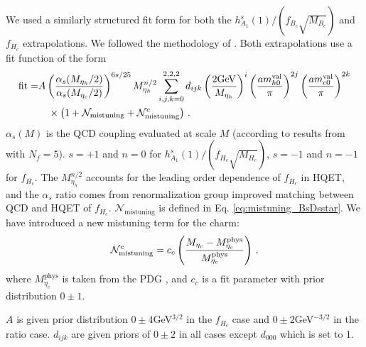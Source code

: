 We used a similarly structured fit form for both the $h_{A_1}^s(1)/(f_{B_c}\sqrt{M_{B_c}})$ and $f_{H_c}$ extrapolations. We followed the methodology of \cite{McNeile:2012qf}. Both extrapolations use a fit function of the form
\begin{align}
  \label{eq:fitfun_ratio}
  \nonumber
  \text{fit} = &A\left({\alpha_s(M_{\eta_h}/2)\over\alpha_s(M_{\eta_c}/2)}\right)^{6s/25} M_{\eta_h}^{n/2} \sum_{i,j,k=0}^{2,2,2} d_{ijk} \left({2\text{GeV}\over M_{\eta_h} }\right)^{i} \left({ am^{\text{val}}_{h0} \over \pi }\right)^{2j} \left({ am^{\text{val}}_{c0} \over \pi }\right)^{2k} \\
  &\quad \times\left( 1 + \mathcal{N}_{\text{mistuning}} + \mathcal{N}^c_{\text{mistuning}} \right)\,.
\end{align}
$\alpha_s(M)$ is the QCD coupling evaluated at scale $M$ (according to results from \cite{Chakraborty:2014aca} with $N_f=5$). $s=+1$ and $n=0$ for $h_{A_1}^s(1)/(f_{H_c}\sqrt{M_{H_c}})$, $s=-1$ and $n=-1$ for $f_{H_c}$. The $M_{\eta_h}^{n/2}$ accounts for the leading order dependence of $f_{H_c}$ in HQET, and the $\alpha_s$ ratio comes from renormalization group improved matching between QCD and HQET of $f_{H_c}$. $\mathcal{N}_{\text{mistuning}}$ is defined in Eq. \eqref{eq:mistuning_BsDsstar}. We have introduced a new mistuning term for the charm:
\begin{align}
  \mathcal{N}^c_{\text{mistuning}} = c_c \left({M_{\eta_c}-M_{\eta_c}^{\text{phys}}\over M_{\eta_c}^{\text{phys}}}\right)\,,
  \label{eq:charmmistuning_BsDsstar}
\end{align}
where $M_{\eta_c}^{\text{phys}}$ is taken from the PDG \cite{PhysRevD.98.030001}, and $c_c$ is a fit parameter with prior distribution $0\pm 1$.

$A$ is given prior distribution $0\pm 4$GeV$^{3/2}$ in the $f_{H_c}$ case and $0\pm 2$GeV$^{-3/2}$ in the ratio case. $d_{ijk}$ are given priors of $0\pm 2$ in all cases except $d_{000}$ which is set to 1.

